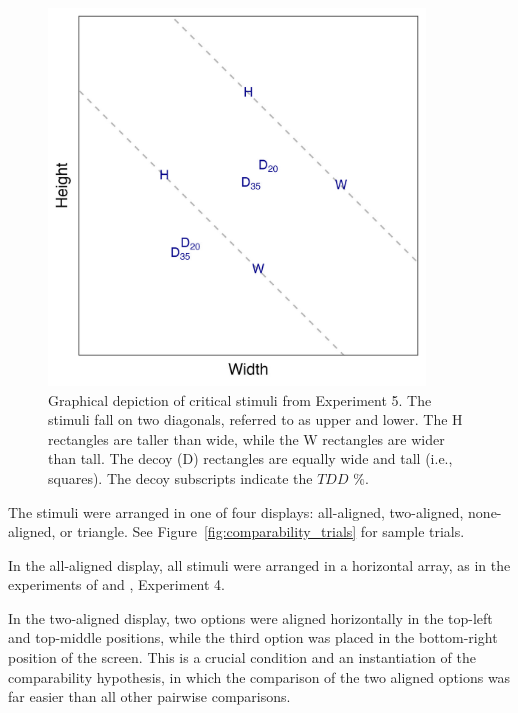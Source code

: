 \begin{figure}
   \centering
   \includegraphics[width=100mm]{figures/comparability_stim.jpg}
   \caption{Graphical depiction of critical stimuli from Experiment 5. The stimuli fall on two diagonals, referred to as upper and lower. The H rectangles are taller than wide, while the W rectangles are wider than tall. The decoy (D) rectangles are equally wide and tall (i.e., squares). The decoy subscripts indicate the $TDD$ $\%$.}
   \label{fig:comparability_stim_plot}
\end{figure}


The stimuli were arranged in one of four displays: all-aligned, two-aligned, none-aligned, or triangle. See Figure~\ref{fig:comparability_trials} for sample trials. 

In the all-aligned display, all stimuli were arranged in a horizontal array, as in the experiments of \textcite{trueblood2013not} and \textcite{spektorWhenGoodLooks2018b}, Experiment 4.

In the two-aligned display, two options were aligned horizontally in the top-left and top-middle positions, while the third option was placed in the bottom-right position of the screen. This is a crucial condition and an instantiation of the comparability hypothesis, in which the comparison of the two aligned options was far easier than all other pairwise comparisons.

